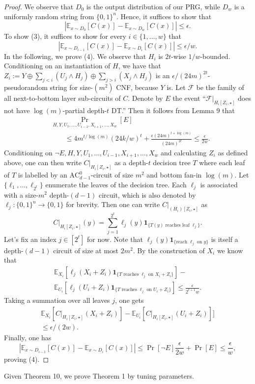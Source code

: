 \begin{proof}
We observe that $D_0$ is the output distribution of our PRG, while $D_w$ is a uniformly random string from $\{0,1\}^n$. Hence, it suffices to show that
\[|\mathbb E_{x\sim D_0}[C(x)]-\mathbb E_{x\sim D_w}[C(x)]|\le\epsilon.\tag{3}\]
To show (3), it suffices to show for every $i\in\{1,\ldots,w\}$ that
\[|\mathbb E_{x\sim D_{i-1}}[C(x)]-\mathbb E_{x\sim D_i}[C(x)]|\le\epsilon/w.\tag{4}\]
In the following, we prove (4). We observe that $H_i$ is $2t$-wise $1/w$-bounded. Conditioning on an instantiation of $H$, we have that $Z_i:=Y\oplus\sum_{j<i}(U_j\land H_j)\oplus\sum_{j>i}(X_j\land H_j)$ is an $\epsilon/(24m)^{2t}$-pseudorandom string for size-$(m^2)$ CNF, because $Y$ is. Let $\mathcal F$ be the family of all next-to-bottom layer sub-circuits of $C$. Denote by $E$ the event ``$\mathcal F|_{H_i[Z_i,\star]}$ does not have $\log(m)$-partial depth-$t$ DT.'' Then it follows from Lemma 9 that
\begin{align*}&\Pr_{H,Y,U_1,\ldots,U_{i-1},X_{i+1},\ldots,X_w}[E]\\&\qquad\le4m^{t/\log(m)}(24k/w)^t+\frac{\epsilon(24m)^{t+\log(m)}}{(24m)^{2t}}\le\frac\epsilon{2w}.\end{align*}
Conditioning on $\neg E,H,Y,U_1,\ldots,U_{i-1},X_{i+1},\ldots,X_w$ and calculating $Z_i$ as defined above, one can then write $C|_{H_i[Z_i,\star]}$ as a depth-$t$ decision tree $T$ where each leaf of $T$ is labelled by an $\mathrm{AC}^0_{d-1}$-circuit of size $m^2$ and bottom fan-in $\log(m)$. Let $\{\ell_1,\ldots,\ell_{2^t}\}$ enumerate the leaves of the decision tree. Each $\ell_j$ is associated with a size-$m^2$ depth-$(d-1)$ circuit, which is also denoted by $\ell_j:\{0,1\}^n\to\{0,1\}$ for brevity. Then one can write $C|_{(H_i)[Z_i,\star]}$ as
\[C|_{H_i[Z_i,\star]}(y)=\sum_{j=1}^{2^t}\ell_j(y)\mathbf1_{\{T(y)\text{ reaches leaf }\ell_j\}}.\]
Let's fix an index $j\in[2^t]$ for now. Note that $\ell_j(y)\mathbf1_{\{\text{reach }\ell_j\text{ on }y\}}$ is itself a depth-$(d-1)$ circuit of size at most $2m^2$. By the construction of $X_i$ we know that
\begin{multline*}\mathbb E_{X_i}[\ell_j(X_i+Z_i)\mathbf1_{\{T\text{ reaches }\ell_j\text{ on }X_i+Z_i\}}]-\\\mathbb E_{U_i}[\ell_j(U_i+Z_i)\mathbf1_{\{T\text{ reaches }\ell_j\text{ on }U_i+Z_i\}}]\le\frac\epsilon{2^{t+1}w}.\end{multline*}
Taking a summation over all leaves $j$, one gets
\begin{multline*}\mathbb E_{X_i}[C|_{H_i[Z_i,\star]}(X_i+Z_i)]-\mathbb E_{U_i}[C|_{H_i[Z_i,\star]}(U_i+Z_i)]]\\\le\epsilon/(2w).\end{multline*}
Finally, one has
\[|\mathbb E_{x\sim D_{i-1}}[C(x)]-\mathbb E_{x\sim D_i}[C(x)]|\le\Pr[\neg E]\frac\epsilon{2w}+\Pr[E]\le\frac\epsilon w,\]
proving (4).\end{proof}
Given Theorem 10, we prove Theorem 1 by tuning parameters.
